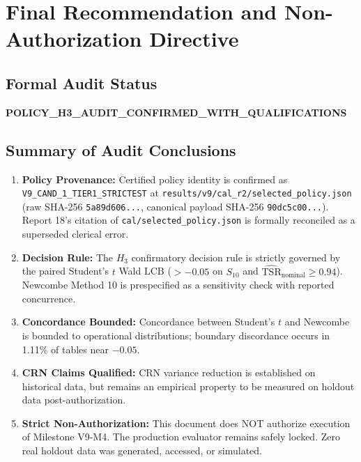 \documentclass[10pt,a4paper]{article}
\begin{document}
\section{Final Recommendation and Non-Authorization Directive}

\subsection{Formal Audit Status}
\begin{center}
\Large \textbf{POLICY\_H3\_AUDIT\_CONFIRMED\_WITH\_QUALIFICATIONS}
\end{center}

\subsection{Summary of Audit Conclusions}
\begin{enumerate}
    \item \textbf{Policy Provenance:} Certified policy identity is confirmed as \texttt{V9\_CAND\_1\_TIER1\_STRICTEST} at \texttt{results/v9/cal\_r2/selected\_policy.json} (raw SHA-256 \texttt{5a89d606...}, canonical payload SHA-256 \texttt{90dc5c00...}). Report 18's citation of \texttt{cal/selected\_policy.json} is formally reconciled as a superseded clerical error.
    \item \textbf{Decision Rule:} The $H_3$ confirmatory decision rule is strictly governed by the paired Student's $t$ Wald LCB ($> -0.05$ on $S_{10}$ and $\widehat{\mathrm{TSR}}_{\mathrm{nominal}} \ge 0.94$). Newcombe Method 10 is prespecified as a sensitivity check with reported concurrence.
    \item \textbf{Concordance Bounded:} Concordance between Student's $t$ and Newcombe is bounded to operational distributions; boundary discordance occurs in 1.11\% of tables near $-0.05$.
    \item \textbf{CRN Claims Qualified:} CRN variance reduction is established on historical data, but remains an empirical property to be measured on holdout data post-authorization.
    \item \textbf{Strict Non-Authorization:} This document does NOT authorize execution of Milestone V9-M4. The production evaluator remains safely locked. Zero real holdout data was generated, accessed, or simulated.
\end{enumerate}
\end{document}

